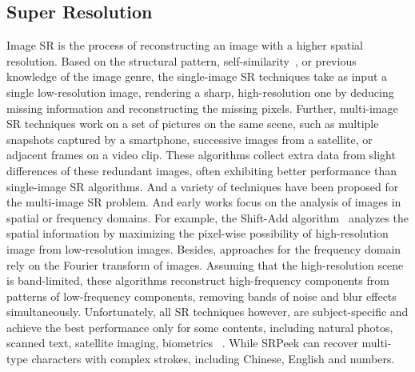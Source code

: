 \subsection{Super Resolution}
Image SR is the process of reconstructing an image with a higher spatial resolution. Based on the structural pattern, self-similarity~\cite{suetake2008image}, or previous knowledge of the image genre, the single-image SR techniques take as input a single low-resolution image, rendering a sharp, high-resolution one by deducing missing information and reconstructing the missing pixels. Further, multi-image SR techniques work on a set of pictures on the same scene, such as multiple snapshots captured by a smartphone, successive images from a satellite, or adjacent frames on a video clip. These algorithms collect extra data from slight differences of these redundant images, often exhibiting better performance than single-image SR algorithms. And a variety of techniques have been proposed for the multi-image SR problem. And early works focus on the analysis of images in spatial or frequency domains. For example, the Shift-Add algorithm~\cite{farsiu2003robust} analyzes the spatial information by maximizing the pixel-wise possibility of high-resolution image from low-resolution images. Besides, approaches for the frequency domain rely on the Fourier transform of images. Assuming that the high-resolution scene is band-limited, these algorithms reconstruct high-frequency components from patterns of low-frequency components, removing bands of noise and blur effects simultaneously. Unfortunately, all SR techniques  however, are subject-specific and achieve the best performance only for some contents, including natural photos, scanned text, satellite imaging, biometrics~\cite{Youm2016Image}
. While \textsf{SRPeek} can recover multi-type characters with complex strokes, including Chinese, English and numbers.

